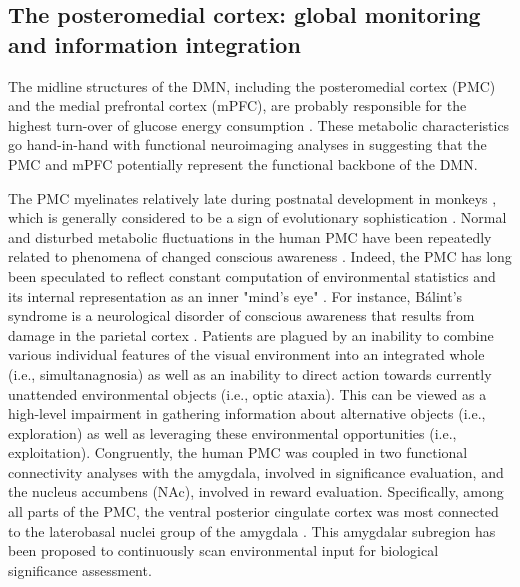 \documentclass[10pt,letterpaper]{article}
\begin{document}
\subsection{The posteromedial cortex: global monitoring and information integration}
The midline structures of the DMN,
including the posteromedial cortex (PMC) and
the medial prefrontal cortex (mPFC),
are probably responsible for the highest turn-over
of glucose energy consumption \citep{raichle2001pnas}.
These metabolic characteristics go hand-in-hand with
functional neuroimaging analyses \citep{andrews2010} in
suggesting that the PMC and mPFC
potentially represent the functional backbone of the DMN.


The PMC myelinates relatively late during postnatal development in monkeys
\citep{goldman1987development}, which is generally considered to
be a sign of evolutionary sophistication \citep{flechsig1920}.
Normal and disturbed metabolic fluctuations in the
human PMC have been repeatedly related to
phenomena of changed conscious awareness \citep{cavanna2006precuneus}.
%
Indeed,
the PMC has long been speculated to reflect constant computation of
environmental statistics and its internal representation
as an inner "mind's eye" \citep{cavanna2006precuneus, leech_pcc2014}.
For instance, B\'alint's syndrome is a neurological disorder of conscious
awareness that results from damage in the parietal cortex
\citep{balint1909seelenlahmung}.
Patients are plagued by an
inability to combine various individual features of the visual
environment into an integrated whole (i.e., simultanagnosia)
as well as an inability to direct action towards
currently unattended environmental objects
(i.e., optic ataxia).
This can be viewed as a high-level impairment in gathering
information about alternative objects (i.e., exploration) as well as
leveraging these environmental opportunities (i.e., exploitation).
Congruently,
the human PMC was coupled in two functional connectivity analyses
with the amygdala, involved in significance evaluation, and
the nucleus accumbens (NAc), involved in reward evaluation.
Specifically, among all parts of the PMC,
the ventral posterior cingulate cortex was
most connected to the laterobasal
nuclei group of the amygdala
\citep{bzdok2015subspecialization}.
This amygdalar subregion has been proposed to
continuously scan environmental input
for biological significance assessment.
\end{document}
